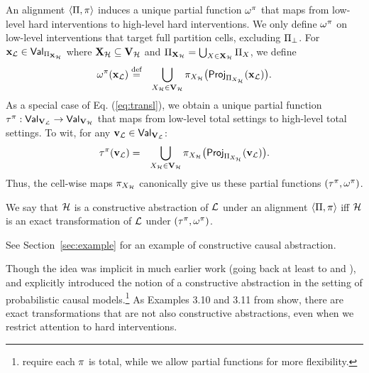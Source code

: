 \documentclass[twoside,11pt]{article}
\begin{document}
\begin{remark} An alignment $\langle \Pi, \pi\rangle$ induces a unique partial function $\omega^{\pi}$ that maps from low-level hard interventions to high-level hard interventions. We only define $\omega^{\pi}$ on low-level interventions that target full partition cells, excluding $\Pi_{\bot}$. For $\mathbf{x}_{\mathcal{L}} \in \mathsf{Val}_{\Pi_{\mathbf{X}_{\mathcal{H}}}}$ where $\mathbf{X}_{\mathcal{H}} \subseteq \mathbf{V}_{\mathcal{H}}$ and $\Pi_{\mathbf{X}_{\mathcal{H}}} = \bigcup_{X \in \mathbf{X}_{\mathcal{H}}} \Pi_{X}$, we define 
\begin{eqnarray} \omega^{\pi}(\mathbf{x}_{\mathcal{L}}) & \overset{\textnormal{def}}{=} & \bigcup_{X_{\mathcal{H}} \in \mathbf{V}_{\mathcal{H}}} \pi_{X_{\mathcal{H}}} \big( \mathsf{Proj}_{\Pi_{X_{\mathcal{H}}}}(\mathbf{x}_{\mathcal{L}}) \big). \label{eq:transl}
\end{eqnarray} 
As a special case of Eq. (\ref{eq:transl}), we obtain a unique partial function $\tau^{\pi}:\mathsf{Val}_{\mathbf{V}_{\mathcal{L}}} \rightarrow \mathsf{Val}_{\mathbf{V}_{\mathcal{H}}}$ that maps from low-level total settings to high-level total settings. To wit,
for any $\mathbf{v}_{\mathcal{L}} \in \mathsf{Val}_{\mathbf{V}_{\mathcal{L}}}$:
\begin{eqnarray} \tau^{\pi}(\mathbf{v}_{\mathcal{L}}) & = & \bigcup_{X_{\mathcal{H}} \in \mathbf{V}_{\mathcal{H}}} \pi_{X_{\mathcal{H}}} \big( \mathsf{Proj}_{\Pi_{X_{\mathcal{H}}}}(\mathbf{v}_{\mathcal{L}}) \big). \label{eq:settransl}
\end{eqnarray} 
Thus, the cell-wise maps $\pi_{X_{\mathcal{H}}}$ canonically give us these partial functions $(\tau^{\pi}, \omega^{\pi})$. 
\end{remark}

\begin{definition}\label{def:cc} 
We say that $\mathcal{H}$ is a constructive abstraction of $\mathcal{L}$ under an alignment $\langle \Pi, \pi \rangle$ iff $\mathcal{H}$ is an exact transformation of $\mathcal{L}$ under $(\tau^{\pi}, \omega^{\pi})$.
\end{definition}
See Section~\ref{sec:example} for an example of constructive causal abstraction.
\begin{remark} \label{remark:bijtrans}
Though the idea was implicit in much earlier work (going back at least to \citealt{Simon1961} and \citealt{Simon}), 
\cite{BackersHalpern2019} and \cite{beckers20a} explicitly introduced the notion of a constructive abstraction in the setting of probabilistic causal models.\footnote{\cite{BackersHalpern2019} require each $\pi$ is total, while we allow partial functions for more flexibility.} As Examples 3.10 and 3.11 from \cite{BackersHalpern2019} show, there are exact transformations that are not also constructive abstractions, even when we restrict attention to hard interventions. 
\end{remark}
\end{document}
